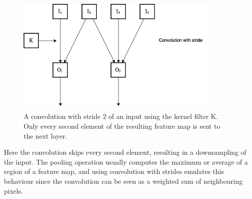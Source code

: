 \documentclass[11pt]{article}
\begin{document}
\begin{figure}[!h]\label{con2}
    \centering
    \includegraphics[width=10cm]{include/strides.png}
    \caption{A convolution with stride $2$ of an input using the kernel filter K. Only every second
        element of the resulting feature map is sent to the next layer.}
    \label{fig:conv}
\end{figure}

Here the convolution skips every second element, resulting in a downsampling
of the input.
The pooling operation usually computes the maximum or average of a region of a feature map,
and using convolution with strides emulates this behaviour since the convolution
can be seen as a weighted sum of neighbouring pixels.



%
%


\end{document}

